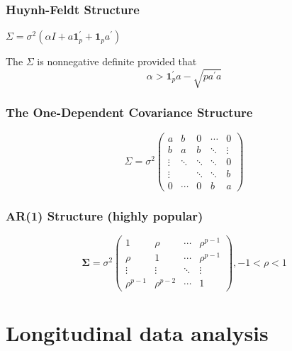 \documentclass[
]{book}
\theoremstyle{definition}
\theoremstyle{definition}
\theoremstyle{definition}
\theoremstyle{remark}
\begin{document}
\hypertarget{huynh-feldt-structure}{%
\subsection{Huynh-Feldt Structure}\label{huynh-feldt-structure}}

\(\Sigma=\sigma^{2}\left(\alpha I+a \mathbf{1}_{p}^{\prime}+\mathbf{1}_{p} a^{\prime}\right)\)

The \(\Sigma\) is nonnegative definite provided that
\[
\alpha>\mathbf{1}_{p}^{\prime} a-\sqrt{p a^{\prime} a}
\]

\hypertarget{the-one-dependent-covariance-structure}{%
\subsection{The One-Dependent Covariance Structure}\label{the-one-dependent-covariance-structure}}

\[
\Sigma=\sigma^{2}\left(\begin{array}{ccccc}
{a} & {b} & {0} & {\cdots} & {0} \\
{b} & {a} & {b} & {\ddots} & {\vdots} \\
{\vdots} & {\ddots} & {\ddots} & {\ddots} & {0} \\
{\vdots} & {} & {\ddots} & {\ddots} & {b} \\
{0} & {\cdots} & {0} & {b} & {a}
\end{array}\right)
\]

\hypertarget{ar1-structure-highly-popular}{%
\subsection{AR(1) Structure (highly popular)}\label{ar1-structure-highly-popular}}

\[
\boldsymbol{\Sigma}=\sigma^{2}\left(\begin{array}{cccc}
{1} & {\rho} & {\cdots} & {\rho^{p-1}} \\
{\rho} & {1} & {\cdots} & {\rho^{p-1}} \\
{\vdots} & {\vdots} & {\ddots} & {\vdots} \\
{\rho^{p-1}} & {\rho^{p-2}} & {\cdots} & {1}
\end{array}\right),-1<\rho<1
\]

\hypertarget{longitudinal-data-analysis}{%
\chapter{Longitudinal data analysis}\label{longitudinal-data-analysis}}
\end{document}
